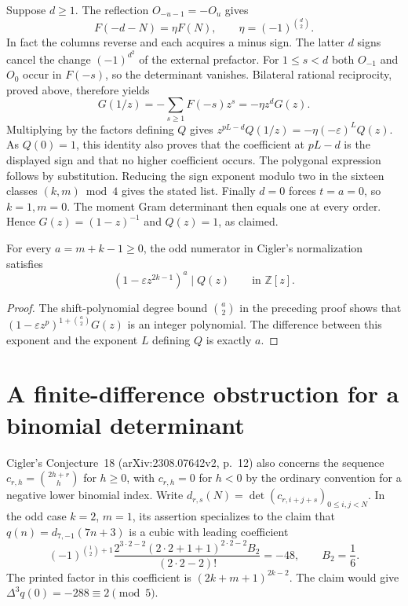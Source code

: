 \documentclass[11pt,a4paper]{article}
\theoremstyle{definition}\newtheorem{problem}[theorem]{Auxiliary problem}
\theoremstyle{remark}\newtheorem*{remark}{Remark}
\begin{document}
Suppose $d\ge1$. The reflection $O_{-u-1}=-O_u$ gives
\[
 F(-d-N)=\eta F(N),\qquad \eta=(-1)^{\binom d2}.
\]
In fact the columns reverse and each acquires a minus sign. The latter
$d$ signs cancel the change $(-1)^{d^2}$ of the external prefactor.
For $1\le s<d$ both $O_{-1}$ and $O_0$ occur in $F(-s)$, so the
determinant vanishes. Bilateral rational reciprocity, proved above,
therefore yields
\[
 G(1/z)=-\sum_{s\ge1}F(-s)z^s=-\eta z^dG(z).
\]
Multiplying by the factors defining $Q$ gives
$z^{pL-d}Q(1/z)=-\eta(-\varepsilon)^LQ(z)$.
As $Q(0)=1$, this identity also proves that the coefficient at $pL-d$
is the displayed sign and that no higher coefficient occurs.
The polygonal expression follows by substitution.
Reducing the sign exponent modulo two in the sixteen classes
$(k,m)\bmod4$ gives the stated list. Finally $d=0$ forces $t=a=0$,
so $k=1,m=0$. The moment Gram determinant then equals one at every
order. Hence $G(z)=(1-z)^{-1}$ and $Q(z)=1$, as claimed.


\begin{corollary}
For every $a=m+k-1\ge0$, the odd numerator in Cigler's normalization satisfies
\[
             (1-\varepsilon z^{2k-1})^{a}\mid Q(z)
             \qquad\text{in }\mathbb Z[z].
\]
\end{corollary}
\begin{proof}
The shift-polynomial degree bound $\binom a2$ in the preceding proof shows that $(1-\varepsilon z^p)^{1+\binom a2}G(z)$ is an integer polynomial. The difference between this exponent and the exponent $L$ defining $Q$ is exactly $a$.
\end{proof}

\section{A finite-difference obstruction for a binomial determinant}
Cigler's Conjecture~18 (arXiv:2308.07642v2, p.~12) also concerns
the sequence $c_{r,h}=\binom{2h+r}{h}$ for $h\ge0$, with $c_{r,h}=0$
for $h<0$ by the ordinary convention for a negative lower binomial index.
Write $d_{r,s}(N)=\det(c_{r,i+j+s})_{0\le i,j<N}$.
In the odd case $k=2$, $m=1$, its assertion specializes to the claim
that $q(n)=d_{7,-1}(7n+3)$ is a cubic with leading coefficient
\[
 (-1)^{\binom12+1}
 \frac{2^{3\cdot2-2}(2\cdot 2+1+1)^{2\cdot2-2}B_2}
 {(2\cdot2-2)!}=-48,
 \qquad B_2=\frac16.
\]
The printed factor in this coefficient is $(2k+m+1)^{2k-2}$.
The claim would give $\Delta^3q(0)=-288\equiv2\pmod5$.
\end{document}
